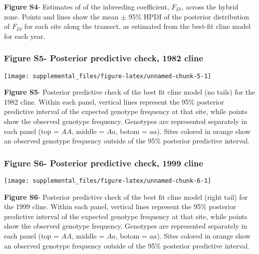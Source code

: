 \documentclass[]{article}
\begin{document}
\textbf{Figure S4}- Estimates of of the inbreeding coefficient,
\(F_{IS}\), across the hybrid zone. Points and lines show the mean
\(\pm\) 95\% HPDI of the posterior distribution of \(F_{IS}\) for each
site along the transect, as estimated from the best-fit cline model for
each year.

\pagebreak

\subsubsection{Figure S5- Posterior predictive check, 1982
cline}\label{figure-s5--posterior-predictive-check-1982-cline}

\begin{center}\texttt{[image: supplemental\_files/figure-latex/unnamed-chunk-5-1]} \end{center}

\textbf{Figure S5}- Posterior predictive check of the best fit cline
model (no tails) for the 1982 cline. Within each panel, vertical lines
represent the 95\% posterior predictive interval of the expected
genotype frequency at that site, while points show the observed genotype
frequency. Genotypes are represented separately in each panel (top =
\(AA\), middle = \(Aa\), botom = \(aa\)). Sites colored in orange show
an observed genotype frequency outside of the 95\% posterior predictive
interval.

\pagebreak

\subsubsection{Figure S6- Posterior predictive check, 1999
cline}\label{figure-s6--posterior-predictive-check-1999-cline}

\begin{center}\texttt{[image: supplemental\_files/figure-latex/unnamed-chunk-6-1]} \end{center}

\textbf{Figure S6}- Posterior predictive check of the best fit cline
model (right tail) for the 1999 cline. Within each panel, vertical lines
represent the 95\% posterior predictive interval of the expected
genotype frequency at that site, while points show the observed genotype
frequency. Genotypes are represented separately in each panel (top =
\(AA\), middle = \(Aa\), botom = \(aa\)). Sites colored in orange show
an observed genotype frequency outside of the 95\% posterior predictive
interval.

\pagebreak
\end{document}
